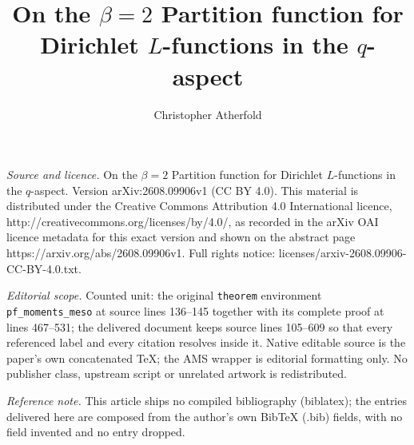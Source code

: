 \documentclass[10pt,a4paper]{amsart}
\numberwithin{equation}{section}
\begin{document}
\title[On the beta=2 Partition function for Dirichlet L-functions i]{On the $\beta=2$ Partition function for Dirichlet $L$-functions in the $q$-aspect}
\author{Christopher Atherfold}
\date{}
\maketitle
\noindent\emph{Source and licence.} On the $\beta=2$ Partition function for Dirichlet $L$-functions in the $q$-aspect. Version arXiv:2608.09906v1 (CC BY 4.0). This material is distributed under the Creative Commons Attribution 4.0 International licence, http://creativecommons.org/licenses/by/4.0/, as recorded in the arXiv OAI licence metadata for this exact version and shown on the abstract page https://arxiv.org/abs/2608.09906v1. Full rights notice: licenses/arxiv-2608.09906-CC-BY-4.0.txt.\par\smallskip
\noindent\textit{Editorial scope.} Counted unit: the original \texttt{theorem} environment \texttt{pf\_moments\_meso} at source lines 136--145 together with its complete proof at lines 467--531; the delivered document keeps source lines 105--609 so that every referenced label and every citation resolves inside it. Native editable source is the paper's own concatenated TeX; the AMS wrapper is editorial formatting only. No publisher class, upstream script or unrelated artwork is redistributed.
\par\smallskip\noindent\textit{Reference note.} This article ships no compiled bibliography (biblatex); the entries delivered here are composed from the author's own BibTeX (.bib) fields, with no field invented and no entry dropped.
\end{document}
